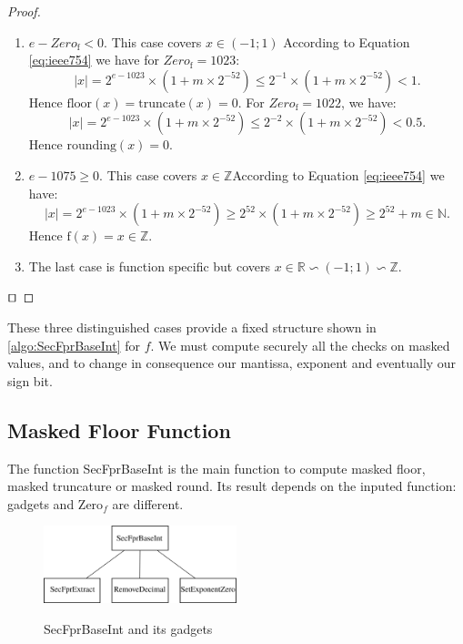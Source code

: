 \documentclass[runningheads]{llncs}
\begin{document}
    \begin{proof}
      \begin{enumerate}
        \item \textbf{$e-Zero_\text{f}<0$}. This case covers $x\in(-1;1)$ According to Equation \ref{eq:ieee754} we have for $Zero_\text{f}=1023$:\begin{equation}\label{eq:zerof1023}|x|=  2^{e-1023} \times (1+m\times 2^{-52})\leq 2^{-1}\times (1+m\times 2^{-52})<1.\end{equation} Hence $\text{floor}(x)=\text{truncate}(x)=0$. For $Zero_\text{f}=1022$, we have: \begin{equation}\label{eq:zerof1022}|x|=  2^{e-1023} \times (1+m\times 2^{-52})\leq 2^{-2}\times (1+m\times 2^{-52})<0.5.\end{equation} Hence $\text{rounding}(x)=0$.
        \item \textbf{$e-1075\geq0$}. This case covers $x\in\mathbb{Z}$According to Equation \ref{eq:ieee754} we have:\begin{equation}\label{eq:1075}|x|= 2^{e-1023} \times (1+m\times 2^{-52})\geq 2^{52}\times (1+m\times 2^{-52})\geq 2^{52} + m \in\mathbb{N}.\end{equation}Hence $\text{f}(x)=x\in\mathbb{Z}$.
        \item The last case is function specific but covers $x\in\mathbb{R}\backsim(-1;1)\backsim\mathbb{Z}$.
      \end{enumerate}\hfill $\qed$ 
    \end{proof}

    
    These three distinguished cases provide a fixed structure shown in \autoref{algo:SecFprBaseInt} for $f$. We must compute securely all the checks on masked values, and to change in consequence our mantissa, exponent and eventually our sign bit. 

    \subsection{Masked Floor Function}
    The function SecFprBaseInt is the main function to compute masked floor, masked truncature or masked round. Its result depends on the inputed function: gadgets and Zero$_f$ are different. 
    \begin{figure}[!ht]
        \centering
        \includegraphics[width=0.5\textwidth]{figure/secpfrhierarchie.pdf}
        \label{fig:hierar}
        \caption{SecFprBaseInt and its gadgets}
    \end{figure}
\end{document}

